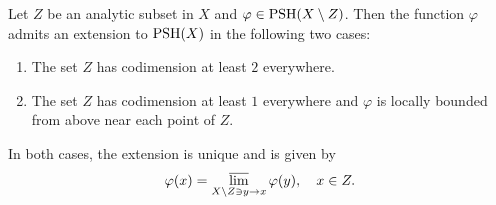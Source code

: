 \begin{theorem}\label{thm:GRexten}
    Let $Z$ be an analytic subset in $X$ and $\varphi\in \mathrm{PSH}(X\setminus Z)$. Then the function $\varphi$ admits an extension to $\mathrm{PSH}(X)$ in the following two cases:
    \begin{enumerate}
        \item\label{itm:thm:GRexten:1} The set $Z$ has codimension at least $2$ everywhere.
        \item\label{itm:thm:GRexten:2} The set $Z$ has codimension at least $1$ everywhere and $\varphi$ is locally bounded from above near each point of $Z$.
    \end{enumerate}
    In both cases, the extension is unique and is given by
    \begin{equation}\label{eq:GRextvarphiexp}
    \varphi(x)=\varlimsup_{X\setminus Z\ni y\to x}\varphi(y),\quad x\in Z.
    \end{equation}
\end{theorem}

